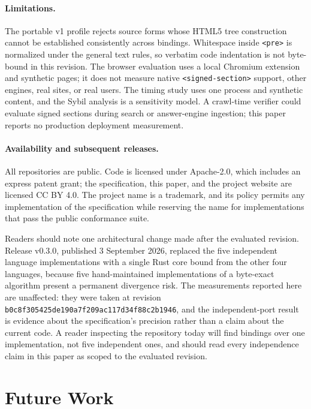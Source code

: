\documentclass{article}
\begin{document}
\paragraph{Limitations.} The portable v1 profile rejects source forms whose HTML5 tree construction cannot be established consistently across bindings. Whitespace inside \texttt{<pre>} is normalized under the general text rules, so verbatim code indentation is not byte-bound in this revision. The browser evaluation uses a local Chromium extension and synthetic pages; it does not measure native \texttt{<signed-section>} support, other engines, real sites, or real users. The timing study uses one process and synthetic content, and the Sybil analysis is a sensitivity model. A crawl-time verifier could evaluate signed sections during search or answer-engine ingestion; this paper reports no production deployment measurement.

\paragraph{Availability and subsequent releases.} All repositories are public. Code is licensed under Apache-2.0, which includes an express patent grant; the specification, this paper, and the project website are licensed CC BY 4.0. The project name is a trademark, and its policy permits any implementation of the specification while reserving the name for implementations that pass the public conformance suite.

Readers should note one architectural change made after the evaluated revision. Release v0.3.0, published 3 September 2026, replaced the five independent language implementations with a single Rust core bound from the other four languages, because five hand-maintained implementations of a byte-exact algorithm present a permanent divergence risk. The measurements reported here are unaffected: they were taken at revision \nolinkurl{b0c8f305425de190a7f209ac117d34f88c2b1946}, and the independent-port result is evidence about the specification's precision rather than a claim about the current code. A reader inspecting the repository today will find bindings over one implementation, not five independent ones, and should read every independence claim in this paper as scoped to the evaluated revision.

\section{Future Work}
\end{document}
